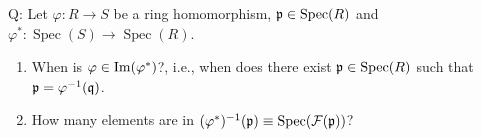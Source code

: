 \begin{proposition}
\end{proposition}


Q: Let $\varphi: R \to S$ be a ring homomorphism, $\mathfrak{p} \in \operatorname{Spec}(R)$ and $\varphi^*: \operatorname{Spec}(S) \to \operatorname{Spec}(R)$.
\begin{enumerate}
    \item When is $\varphi \in \operatorname{Im}(\varphi^*)$?, i.e., when does there exist $\mathfrak{p} \in \operatorname{Spec}(R)$ such that $\mathfrak{p}  = \varphi^{-1}(\mathfrak{q})$.
    \item How many elements are in $(\varphi^*)^{-1}(\mathfrak{p}) \equiv \operatorname{Spec}(\mathcal{F}(\mathfrak{p}))$?
\end{enumerate}

